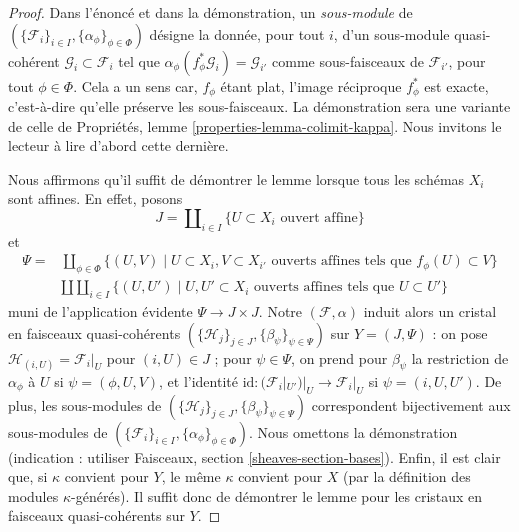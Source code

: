\begin{proof}
Dans l'énoncé et dans la démonstration, un {\it sous-module} de $(\{\mathcal{F}_i\}_{i \in I}, \{\alpha_\phi\}_{\phi \in \Phi})$ désigne la donnée, pour tout $i$, d'un sous-module quasi-cohérent $\mathcal{G}_i \subset \mathcal{F}_i$ tel que $\alpha_\phi(f_\phi^*\mathcal{G}_i) = \mathcal{G}_{i'}$ comme sous-faisceaux de $\mathcal{F}_{i'}$, pour tout $\phi \in \Phi$. Cela a un sens car, $f_\phi$ étant plat, l'image réciproque $f^*_\phi$ est exacte, c'est-à-dire qu'elle préserve les sous-faisceaux. La démonstration sera une variante de celle de Propriétés, lemme \ref{properties-lemma-colimit-kappa}. Nous invitons le lecteur à lire d'abord cette dernière.

\medskip\noindent
Nous affirmons qu'il suffit de démontrer le lemme lorsque tous les schémas $X_i$ sont affines. En effet, posons
$$
J = \coprod\nolimits_{i \in I} \{U \subset X_i\text{ ouvert affine}\}
$$
et
\begin{align*}
\Psi = & \coprod\nolimits_{\phi \in \Phi}
\{
(U, V) \mid
U \subset X_i, V \subset X_{i'}\text{ ouverts affines tels que } f_\phi(U) \subset V
\} \\
&
\amalg \coprod\nolimits_{i \in I}
\{
(U, U') \mid
U, U' \subset X_i\text{ ouverts affines tels que } U \subset U'
\}
\end{align*}
muni de l'application évidente $\Psi \to J \times J$. Notre $(\mathcal{F}, \alpha)$ induit alors un cristal en faisceaux quasi-cohérents $(\{\mathcal{H}_j\}_{j \in J}, \{\beta_\psi\}_{\psi \in \Psi})$ sur $Y = (J, \Psi)$ : on pose $\mathcal{H}_{(i, U)} = \mathcal{F}_i|_U$ pour $(i, U) \in J$ ; pour $\psi \in \Psi$, on prend pour $\beta_\psi$ la restriction de $\alpha_\phi$ à $U$ si $\psi = (\phi, U, V)$, et l'identité $\text{id} : (\mathcal{F}_i|_{U'})|_U \to \mathcal{F}_i|_U$ si $\psi = (i, U, U')$. De plus, les sous-modules de $(\{\mathcal{H}_j\}_{j \in J}, \{\beta_\psi\}_{\psi \in \Psi})$ correspondent bijectivement aux sous-modules de $(\{\mathcal{F}_i\}_{i \in I}, \{\alpha_\phi\}_{\phi \in \Phi})$. Nous omettons la démonstration (indication : utiliser Faisceaux, section \ref{sheaves-section-bases}). Enfin, il est clair que, si $\kappa$ convient pour $Y$, le même $\kappa$ convient pour $X$ (par la définition des modules $\kappa$-générés). Il suffit donc de démontrer le lemme pour les cristaux en faisceaux quasi-cohérents sur $Y$.


\end{proof}
